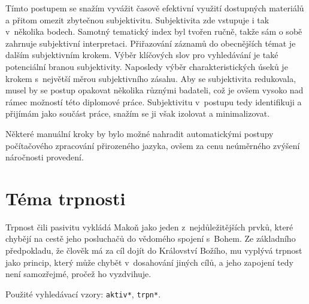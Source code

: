 Tímto postupem se snažím vyvážit časově efektivní využití dostupných materiálů a
přitom omezit zbytečnou subjektivitu. Subjektivita zde vstupuje i tak v~několika
bodech. Samotný tematický index byl tvořen ručně, takže sám o sobě zahrnuje
subjektivní interpretaci. Přiřazování záznamů do obecnějších témat je dalším
subjektivním krokem. Výběr klíčových slov pro vyhledávání je také potenciální
branou subjektivity. Naposledy výběr charakteristických úseků je krokem
s~největší měrou subjektivního zásahu. Aby se subjektivita redukovala, musel by
se postup opakovat několika různými badateli, což je ovšem vysoko nad rámec
možností této diplomové práce. Subjektivitu v~postupu tedy identifikuji a
přijímám jako součást práce, snažím se ji však izolovat a minimalizovat.

Některé manuální kroky by bylo možné nahradit automatickými postupy počítačového
zpracování přirozeného jazyka, ovšem za cenu neúměrného zvýšení náročnosti
provedení.

\section{Téma trpnosti}

Trpnost čili pasivitu vykládá Makoň jako jeden z~nejdůležitějších prvků, které
chybějí na cestě jeho posluchačů do vědomého spojení s~Bohem. Ze základního
předpokladu, že člověk má za cíl dojít do Království Božího, mu vyplývá trpnost
jako princip, který může chybět v~dosahování jiných cílů, a jeho zapojení tedy
není samozřejmé, pročež ho vyzdvihuje.

Použité vyhledávací vzory: \texttt{aktiv*}, \texttt{trpn*}.

